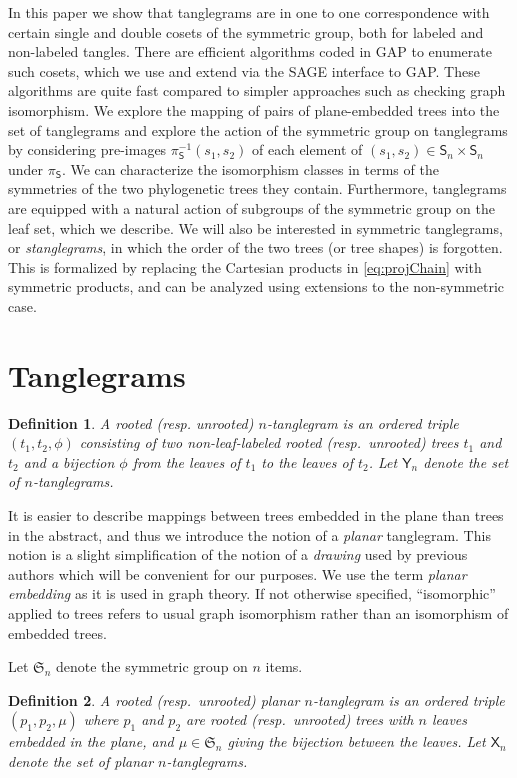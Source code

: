 \documentclass{amsart}
\newtheorem{definition}{Definition}
\newcommand{\fS}{\mathfrak S}
\newcommand{\pairing}{\mu}
\newcommand{\shape}{\mathsf{S}}
\newcommand{\ptangle}{\mathsf{X}}
\newcommand{\tangle}{\mathsf{Y}}
\begin{document}
In this paper we show that tanglegrams are in one to one correspondence with certain single and double cosets of the symmetric group, both for labeled and non-labeled tangles.
There are efficient algorithms coded in GAP \cite{GAP4} to enumerate such cosets, which we use and extend via the SAGE \cite{SteinJoyner2005} interface to GAP.
These algorithms are quite fast compared to simpler approaches such as checking graph isomorphism.
We explore the mapping of pairs of plane-embedded trees into the set of tanglegrams and explore the action of the symmetric group on tanglegrams by considering pre-images $\pi_\shape^{-1}(s_1, s_2)$ of each element of $(s_1, s_2) \in \shape_n \times \shape_n$ under $\pi_\shape$.
We can characterize the isomorphism classes in terms of the symmetries of the two phylogenetic trees they contain.
Furthermore, tanglegrams are equipped with a natural action of subgroups of the symmetric group on the leaf set, which we describe.
We will also be interested in symmetric tanglegrams, or \emph{stanglegrams}, in which the order of the two trees (or tree shapes) is forgotten.
This is formalized by replacing the Cartesian products in \eqref{eq:projChain} with symmetric products, and can be analyzed using extensions to the non-symmetric case.


\section{Tanglegrams}
\begin{definition}
\label{def:tanglegram}
A rooted (resp. unrooted) $n$-\emph{tanglegram} is an ordered triple $(t_1, t_2, \phi)$ consisting of two non-leaf-labeled rooted (resp.\ unrooted) trees $t_1$ and $t_2$ and a bijection $\phi$ from the leaves of $t_1$ to the leaves of $t_2$.
Let $\tangle_n$ denote the set of $n$-tanglegrams.
\end{definition}

It is easier to describe mappings between trees embedded in the plane than trees in the abstract, and thus we introduce the notion of a \emph{planar} tanglegram.
This notion is a slight simplification of the notion of a \emph{drawing} used by previous authors \cite{Venkatachalam2010-zh} which will be convenient for our purposes.
We use the term \emph{planar embedding} as it is used in graph theory.
If not otherwise specified, ``isomorphic'' applied to trees refers to usual graph isomorphism rather than an isomorphism of embedded trees.

Let $\fS_n$ denote the symmetric group on $n$ items.
\begin{definition}
\label{def:ptanglegram}
A rooted (resp.\ unrooted) \emph{planar $n$-tanglegram} is an ordered triple $(p_1, p_2, \pairing)$ where $p_1$ and $p_2$ are rooted (resp.\ unrooted) trees with $n$ leaves embedded in the plane, and $\pairing \in \fS_n$ giving the bijection between the leaves.
Let $\ptangle_n$ denote the set of planar $n$-tanglegrams.
\end{definition}
\end{document}
